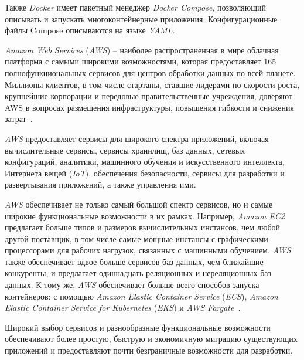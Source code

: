 Также \textit{Docker} имеет пакетный менеджер \textit{Docker Compose}, позволяющий описывать и запускать многоконтейнерные приложения. Конфигурационные файлы Compose описываются на языке \textit{YAML}.

\textit{Amazon Web Services} (\textit{AWS}) – наиболее распространенная в мире облачная платформа с самыми широкими возможностями, которая предоставляет 165 полнофункциональных сервисов для центров обработки данных по всей планете. Миллионы клиентов, в том числе стартапы, ставшие лидерами по скорости роста, крупнейшие корпорации и передовые правительственные учреждения, доверяют AWS в вопросах размещения инфраструктуры, повышения гибкости и снижения затрат~\cite{aws}.

\textit{AWS} предоставляет сервисы для широкого спектра приложений, включая вычислительные сервисы, сервисы хранилищ, баз данных, сетевых конфигураций, аналитики, машинного обучения и искусственного интеллекта, Интернета вещей (\textit{IoT}), обеспечения безопасности, сервисы для разработки и развертывания приложений, а также управления ими.

\textit{AWS} обеспечивает не только самый большой спектр сервисов, но и самые широкие функциональные возможности в их рамках. Например, \textit{Amazon EC2} предлагает больше типов и размеров вычислительных инстансов, чем любой другой поставщик, в том числе самые мощные инстансы с графическими процессорами для рабочих нагрузок, связанных с машинными обучением. \textit{AWS} также обеспечивает вдвое больше сервисов баз данных, чем ближайшие конкуренты, и предлагает одиннадцать реляционных и нереляционных баз данных. К тому же, \textit{AWS} обеспечивает больше всего способов запуска контейнеров: с помощью \textit{Amazon Elastic Container Service} (\textit{ECS}), \textit{Amazon Elastic Container Service for Kubernetes} (\textit{EKS}) и \textit{AWS Fargate}~\cite{aws}.

Широкий выбор сервисов и разнообразные функциональные возможности обеспечивают более простую, быструю и экономичную миграцию существующих приложений и предоставляют почти безграничные возможности для разработки.

